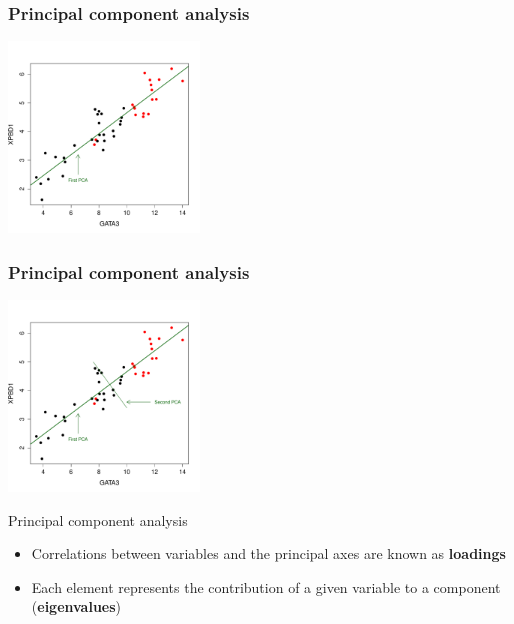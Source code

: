 \documentclass[10pt,xcolor=dvipsnames]{beamer}\usepackage[]{graphicx}\usepackage[]{color}
\newenvironment{knitrout}{}{} %
\begin{document}
\begin{frame}\frametitle{Principal component analysis}

\begin{knitrout}\footnotesize
{}\color{fgcolor}

{\centering \includegraphics[width=2in]{figure/plot_pca_2-1} 

}



\end{knitrout}

\end{frame}


\begin{frame}\frametitle{Principal component analysis}

\begin{knitrout}\footnotesize
{}\color{fgcolor}

{\centering \includegraphics[width=2in]{figure/plot_pca_3-1} 

}



\end{knitrout}

\end{frame}




\begin{frame}[plain]{Principal component analysis}

\begin{itemize} 
 \item Correlations between variables and the principal axes are known as \textbf{loadings}
 \item Each element represents the contribution of a given variable to a component (\textbf{eigenvalues})
\end{itemize}

\end{frame}
\end{document}
